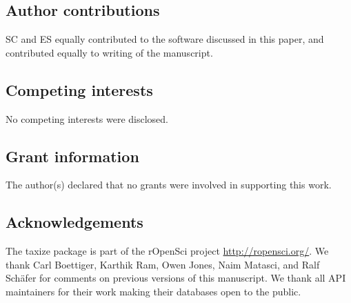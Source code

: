 \documentclass[10pt,a4paper,twocolumn]{article}\usepackage[]{graphicx}\usepackage[]{color}
\begin{document}
\subsection*{Author contributions}
SC and ES equally contributed to the software discussed in this paper, and contributed equally to writing of the manuscript. 

\subsection*{Competing interests}
No competing interests were disclosed.

\subsection*{Grant information}
The author(s) declared that no grants were involved in supporting this work.

\subsection*{Acknowledgements}
The taxize package is part of the rOpenSci project \url{http://ropensci.org/}. We thank Carl Boettiger, Karthik Ram, Owen Jones, Naim Matasci, and Ralf Sch\"{a}fer for comments on previous versions of this manuscript. We thank all API maintainers for their work making their databases open to the public.

\nocite{*}
{\small
}
\end{document}
